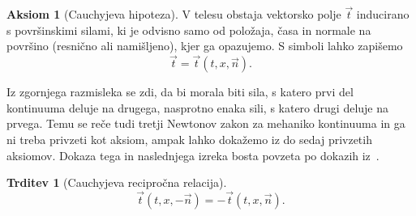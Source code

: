 \documentclass[12pt,a4paper,twoside]{article}
\theoremstyle{definition} %
\newtheorem{aksiom}{Aksiom}
\theoremstyle{plain} %
\newtheorem{trditev}[definicija]{Trditev}
\numberwithin{equation}{section}
\newcommand{\vt}{\vec{t}}
\newcommand{\vn}{\vec{n}}
\newcommand{\vx}{x}
\begin{document}
\begin{aksiom}[Cauchyjeva hipoteza]
  V telesu obstaja vektorsko polje $\vt$ inducirano s površinskimi silami, ki
  je odvisno samo od položaja, časa in normale na površino (resnično ali
  namišljeno), kjer ga opazujemo.  S simboli lahko zapišemo
  \[
    \vt = \vt(t, \vx, \vn).
  \]
\end{aksiom}

Iz zgornjega razmisleka se zdi, da bi morala biti sila, s katero prvi del
kontinuuma deluje na drugega, nasprotno enaka sili, s katero drugi deluje na
prvega. Temu se reče tudi tretji Newtonov zakon za mehaniko kontinuuma in
ga ni treba privzeti kot aksiom, ampak lahko dokažemo iz do sedaj
privzetih aksiomov. Dokaza tega in naslednjega izreka bosta povzeta po dokazih
iz~\cite[str.\ 104--107]{hjelmstad2007fundamentals}.
\begin{trditev}[Cauchyjeva recipročna relacija]
  \label{trd:cauchy-reciprocal}
  \begin{equation}
    \vt(t, \vx, -\vn) = -\vt(t, \vx, \vn).
    \label{eq:cauchy-reciprocal}
  \end{equation}
\end{trditev}
\end{document}
